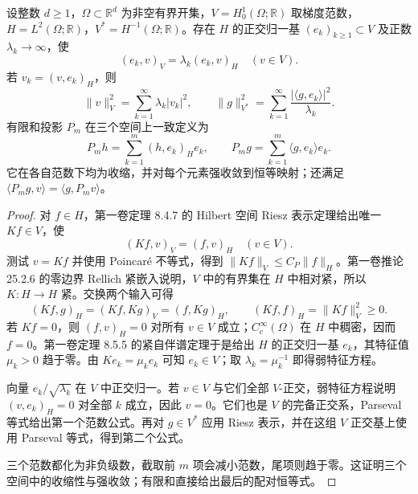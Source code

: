 \begin{lemma}[能量空间的稳定谱投影]\label{b2:lem:D6-stable-projections}
设整数 \(d\geq1\)，\(\Omega\subset\mathbb R^d\) 为非空有界开集，\(V=H_0^1(\Omega;\mathbb R)\) 取梯度范数，\(H=L^2(\Omega;\mathbb R)\)，\(V^*=H^{-1}(\Omega;\mathbb R)\)。存在 \(H\) 的正交归一基 \((e_k)_{k\geq1}\subset V\) 及正数 \(\lambda_k\to\infty\)，使
\[
 (e_k,v)_V=\lambda_k(e_k,v)_H\quad(v\in V).
\]
若 \(v_k=(v,e_k)_H\)，则
\[
 \|v\|_V^2=\sum_{k=1}^\infty\lambda_k|v_k|^2,
 \qquad
 \|g\|_{V^*}^2=\sum_{k=1}^\infty
       \frac{|\langle g,e_k\rangle|^2}{\lambda_k}.
\]
有限和投影 \(P_m\) 在三个空间上一致定义为
\[
 P_mh=\sum_{k=1}^m(h,e_k)_He_k,\qquad
 P_mg=\sum_{k=1}^m\langle g,e_k\rangle e_k.
\]
它在各自范数下均为收缩，并对每个元素强收敛到恒等映射；还满足
\(\langle P_mg,v\rangle=\langle g,P_mv\rangle\)。
\end{lemma}
\begin{proof}
对 \(f\in H\)，第一卷定理 8.4.7 的 Hilbert 空间 Riesz 表示定理给出唯一 \(Kf\in V\)，使
\[
 (Kf,v)_V=(f,v)_H\quad(v\in V).
\]
测试 \(v=Kf\) 并使用 Poincaré 不等式，得到 \(\|Kf\|_V\leq C_P\|f\|_H\)。第一卷推论 25.2.6 的零边界 Rellich 紧嵌入说明，\(V\) 中的有界集在 \(H\) 中相对紧，所以 \(K:H\to H\) 紧。交换两个输入可得
\[
 (Kf,g)_H=(Kf,Kg)_V=(f,Kg)_H,
 \qquad (Kf,f)_H=\|Kf\|_V^2\geq0.
\]
若 \(Kf=0\)，则 \((f,v)_H=0\) 对所有 \(v\in V\) 成立；\(C_c^\infty(\Omega)\) 在 \(H\) 中稠密，因而 \(f=0\)。第一卷定理 8.5.5 的紧自伴谱定理于是给出 \(H\) 的正交归一基 \(e_k\)，其特征值 \(\mu_k>0\) 趋于零。由 \(Ke_k=\mu_ke_k\) 可知 \(e_k\in V\)；取 \(\lambda_k=\mu_k^{-1}\) 即得弱特征方程。

向量 \(e_k/\sqrt{\lambda_k}\) 在 \(V\) 中正交归一。若 \(v\in V\) 与它们全部 \(V\)-正交，弱特征方程说明 \((v,e_k)_H=0\) 对全部 \(k\) 成立，因此 \(v=0\)。它们也是 \(V\) 的完备正交系，Parseval 等式给出第一个范数公式。再对 \(g\in V^*\) 应用 Riesz 表示，并在这组 \(V\) 正交基上使用 Parseval 等式，得到第二个公式。

三个范数都化为非负级数，截取前 \(m\) 项会减小范数，尾项则趋于零。这证明三个空间中的收缩性与强收敛；有限和直接给出最后的配对恒等式。
\end{proof}

